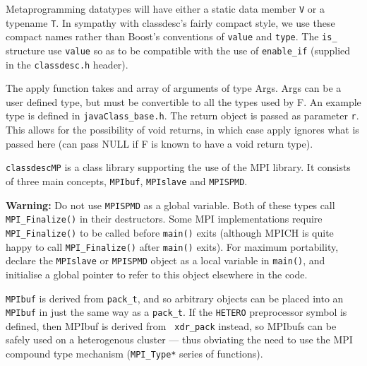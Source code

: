 Metaprogramming datatypes will have either a static data member
\verb+V+ or a typename \verb+T+. In sympathy with classdesc's fairly
compact style, we use these compact names rather than Boost's
conventions of \verb+value+ and \verb+type+. The \verb+is_+ structure
use \verb+value+ so as to be compatible with the use of
\verb+enable_if+ (supplied in the \verb+classdesc.h+ header).

The apply function takes and array of arguments of type Args. Args can
be a user defined type, but must be convertible to all the types used
by F. An example type is defined in \verb+javaClass_base.h+.
The return object is passed as parameter \verb+r+. This allows for the
possibility of void returns, in which case apply ignores what is
passed here (can pass NULL if F is known to have a void return type).


{\tt classdescMP} is a class library supporting the use of the MPI
library. It consists of three main concepts, {\tt MPIbuf},
{\tt MPIslave} and {\tt MPISPMD}.

{\bf Warning:} Do not use {\tt MPISPMD} as a global
variable. Both of these types call \verb+MPI_Finalize()+ in their
destructors. Some MPI implementations require \verb+MPI_Finalize()+ to
be called before \verb+main()+ exits (although MPICH is quite happy to
call \verb+MPI_Finalize()+ after \verb+main()+ exits). For maximum
portability, declare the {\tt MPIslave} or {\tt MPISPMD} object as a
local variable in \verb+main()+, and initialise a global pointer to
refer to this object elsewhere in the code.


{\tt MPIbuf} is derived from {\tt pack\_t}, and so
arbitrary objects can be placed into an {\tt MPIbuf} in just the same
way as a {\tt pack\_t}. If the \verb+HETERO+
preprocessor symbol is defined, then MPIbuf is derived from {\tt
xdr\_pack} instead, so MPIbufs can be safely used on
a heterogenous cluster --- thus obviating the need to use the MPI
compound type mechanism ({\tt MPI\_Type*} series of functions).

